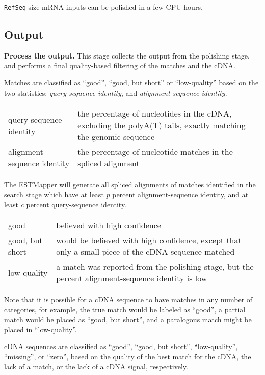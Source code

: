 \documentclass[twoside,11pt]{book}
\begin{document}
{\tt RefSeq} size mRNA inputs can be polished in a few CPU hours.

\subsection*{Output}

{\bf Process the output.}  This stage collects the
output from the polishing stage, and performs a final quality-based
filtering of the matches and the cDNA.

Matches are classified as ``good'', ``good, but short'' or
``low-quality'' based on the two statistics: {\em query-sequence
identity}, and {\em alignment-sequence identity}.

\begin{tabular}{|p{1.7in}|p{3.0in}|}
\hline
query-sequence identity     & the percentage of nucleotides in the cDNA, excluding the polyA(T) tails, exactly matching the genomic sequence \\
alignment-sequence identity & the percentage of nucleotide matches in the spliced alignment \\
\hline
\end{tabular}

The ESTMapper will generate all spliced alignments of matches
identified in the search stage which have at least $p$ percent
alignment-sequence identity, and at least $c$ percent query-sequence
identity.

\begin{tabular}{|p{1.7in}|p{3.0in}|}
\hline
good             & believed with high confidence \\
good, but short  & would be believed with high confidence, except that
                   only a small piece of the cDNA sequence matched \\
low-quality      & a match was reported from the polishing stage, but
                   the percent alignment-sequence identity is low \\
\hline
\end{tabular}

Note that it is possible for a cDNA sequence to have matches in any
number of categories, for example, the true match would be labeled as
``good'', a partial match would be placed as ``good, but short'', and
a paralogous match might be placed in ``low-quality''.

cDNA sequences are classified as ``good'', ``good, but short'',
``low-quality'', ``missing'', or ``zero'', based on the quality of the
best match for the cDNA, the lack of a match, or the lack of a cDNA
signal, respectively.
\end{document}
